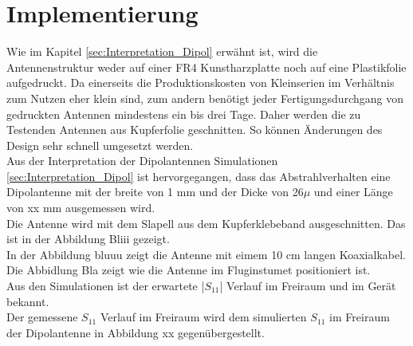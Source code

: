 \newpage 
\thispagestyle{empty}
\chapter{Implementierung}\label{sec:Implementierung}
Wie im Kapitel \ref{sec:Interpretation_Dipol} erwähnt ist, wird die Antennenstruktur weder auf einer FR4 Kunstharzplatte noch auf eine Plastikfolie aufgedruckt. Da einerseits die Produktionskosten von Kleinserien im Verhältnis zum Nutzen eher klein sind, zum andern benötigt jeder Fertigungsdurchgang von gedruckten Antennen  mindestens ein bis drei Tage. Daher werden die zu Testenden Antennen aus Kupferfolie geschnitten. So können Änderungen des Design sehr schnell umgesetzt werden.\\

Aus der Interpretation der Dipolantennen Simulationen \ref{sec:Interpretation_Dipol} ist hervorgegangen, dass das Abstrahlverhalten eine Dipolantenne mit der breite von 1 mm und der Dicke von 26$\mu$ und einer Länge von xx mm ausgemessen wird.\\

Die Antenne wird mit dem Slapell aus dem Kupferklebeband ausgeschnitten. Das ist in der Abbildung Bliii gezeigt.\\

In der Abbildung bluuu zeigt die Antenne mit eimem 10 cm langen Koaxialkabel.\\

Die Abbidlung Bla zeigt wie die Antenne im Fluginstumet positioniert ist.\\


Aus den Simulationen ist der erwartete |$S_{11}$| Verlauf im Freiraum und im Gerät bekannt.\\

Der gemessene $S_{11}$ Verlauf im Freiraum wird dem simulierten $S_{11}$ im Freiraum der Dipolantenne in Abbildung xx gegenübergestellt.\\
%	

